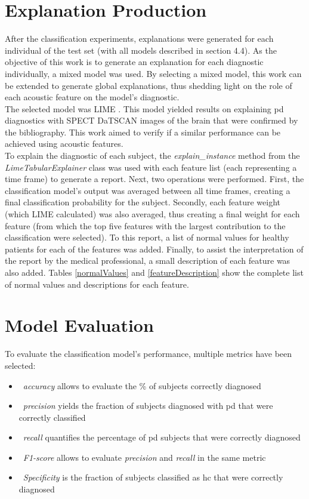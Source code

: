 \section{Explanation Production}

After the classification experiments, explanations were generated for each individual of the test set (with all models described in section 4.4). As the objective of this work is to generate an explanation for each diagnostic individually, a mixed model was used. By selecting a mixed model, this work can be extended to generate global explanations, thus shedding light on the role of each acoustic feature on the model's diagnostic.
\\
The selected model was LIME \cite{LIME}. This model yielded results on explaining \gls{pd} diagnostics with SPECT DaTSCAN images of the brain that were confirmed by the bibliography. This work aimed to verify if a similar performance can be achieved using acoustic features.
\\
To explain the diagnostic of each subject, the \textit{explain\_instance} method from the \textit{LimeTabularExplainer} class was used with each feature list (each representing a time frame) to generate a report. Next, two operations were performed. First, the classification model's output was averaged between all time frames, creating a final classification probability for the subject. Secondly, each feature weight (which LIME calculated) was also averaged, thus creating a final weight for each feature (from which the top five features with the largest contribution to the classification were selected). To this report, a list of normal values for healthy patients for each of the features was added. Finally, to assist the interpretation of the report by the medical professional, a small description of each feature was also added. Tables \ref{normalValues} and \ref{featureDescription} show the complete list of normal values and descriptions for each feature.

\section{Model Evaluation}

To evaluate the classification model's performance, multiple metrics have been selected:

\begin{itemize}
	\item ~\textit{accuracy} allows to evaluate the \% of subjects correctly diagnosed
	\item ~\textit{precision}  yields the fraction of subjects diagnosed with \gls{pd} that were correctly classified
	\item ~\textit{recall} quantifies the percentage of \gls{pd} subjects that were correctly diagnosed
	\item ~\textit{F1-score} allows to evaluate \textit{precision} and \textit{recall} in the same metric
	\item ~\textit{Specificity} is the fraction of subjects classified as \gls{hc} that were correctly diagnosed
\end{itemize}

